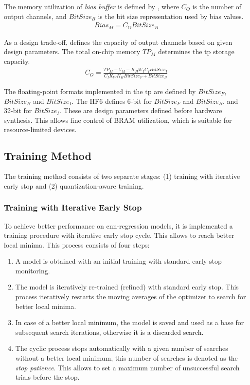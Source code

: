 The memory utilization of \emph{bias buffer} is defined by , where $C_{O}$ is the number of output channels, and $BitSize_{B}$ is the bit size representation used by bias values.
\begin{eqnarray} \label{eq:bias_memory}
Bias_{M}=C_{O}BitSize_{B}
\end{eqnarray}

As a design trade-off,  defines the capacity of output channels based on given design parameters. The total on-chip memory $TP_{M}$ determines the \gls{tp} storage capacity.
\begin{eqnarray} \label{eq:channel_in_memory}
C_{O}=\frac{TP_{M}-V_{M}-K_{H}W_{I}C_{I}BitSize_{I}}{C_{I}K_{W}K_{H}BitSize_{F}+BitSize_{B}}
\end{eqnarray}

The floating-point formats implemented in the \gls{tp} are defined by $BitSize_F$, $BitSize_B$ and $BitSize_I$. The HF6 defines 6-bit for $BitSize_F$ and $BitSize_B$, and 32-bit for $BitSize_I$. These are design parameters defined before hardware synthesis. This allows fine control of BRAM utilization, which is suitable for resource-limited devices.
\FloatBarrier
\subsection{Training Method}
The training method consists of two separate stages: (1) training with iterative early stop and (2) quantization-aware training.
 
\subsubsection{Training with Iterative Early Stop}
To achieve better performance on \gls{cnn}-regression models, it is implemented a training procedure with iterative early stop cycle. This allows to reach better local minima. This process consists of four steps:

\begin{enumerate}
	\item A model is obtained with an initial training with standard early stop monitoring.
	\item The model is iteratively re-trained (refined) with standard early stop. This process iteratively restarts the moving averages of the optimizer to search for better local minima.
	\item In case of a better local minimum, the model is saved and used as a base for subsequent search iterations, otherwise it is a discarded search.
	\item The cyclic process stops automatically with a given number of searches without a better local minimum, this number of searches is denoted as the \textit{stop patience}. This allows to set a maximum number of unsuccessful search trials before the stop.
\end{enumerate}

